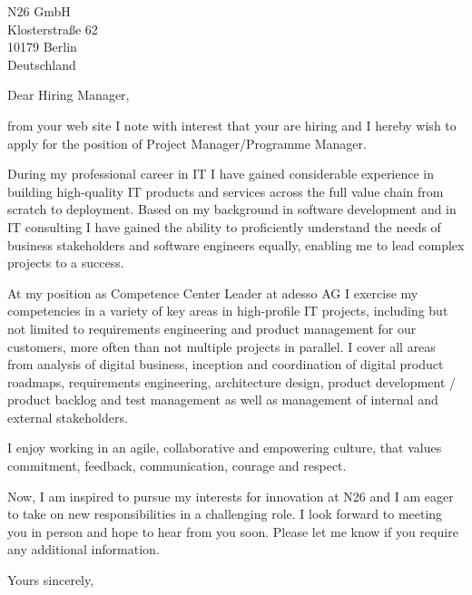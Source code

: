 \documentclass[10pt,a4paper]{dinbrief}
\date{\today}
\begin{document}
 
\begin{letter}  
{%
	N26 GmbH\\
	Klosterstraße 62\\
	10179 Berlin\\
	Deutschland
}
\subject{\bf Job Application Project Manager/Programme Manager}
\opening{Dear Hiring Manager,}

from your web site I note with interest that your are hiring and I hereby wish to apply for the position of Project Manager/Programme Manager. 

During my professional career in IT I have gained considerable experience in building high-quality IT products and services across the full value chain from scratch to deployment. Based on my background in software development and in IT consulting I have gained the ability to proficiently understand the needs of business stakeholders and software engineers equally, enabling me to lead complex projects to a success. 

At my position as Competence Center Leader at adesso AG I exercise my competencies in a variety of key areas in high-profile IT projects, including but not limited to requirements engineering and product management for our customers, more often than not multiple projects in parallel. I cover all areas from analysis of digital business, inception and coordination of digital product roadmaps, requirements engineering, architecture design, product development / product backlog and test management as well as management of internal and external stakeholders.


I enjoy working in an agile, collaborative and empowering culture, that values commitment, feedback, communication, courage and respect. 


Now, I am inspired to pursue my interests for innovation at N26 and I am eager to take on new responsibilities in a challenging role. I look forward to meeting you in person and hope to hear from you soon. Please let me know if you require any additional information.

\closing{Yours sincerely,}
\end{letter}
\end{document}
